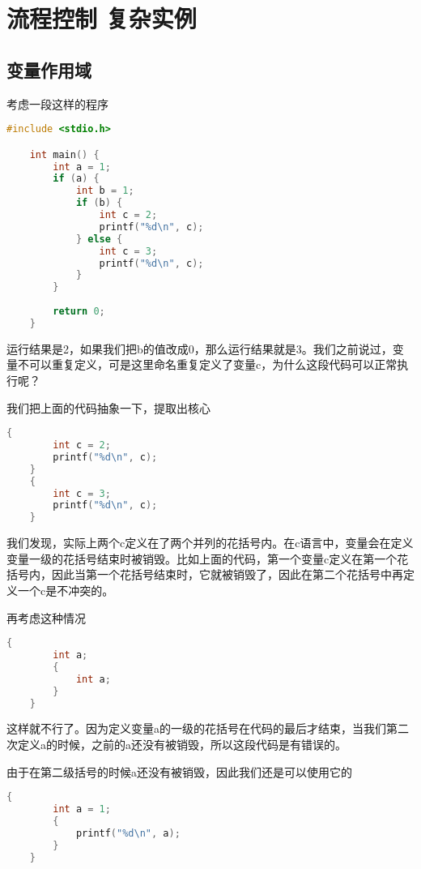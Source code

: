 \section{流程控制 复杂实例}

\subsection{变量作用域}

考虑一段这样的程序

\begin{lstlisting}[language=C]
    #include <stdio.h>

    int main() {
        int a = 1;
        if (a) {
            int b = 1;
            if (b) {
                int c = 2;
                printf("%d\n", c);
            } else {
                int c = 3;
                printf("%d\n", c);
            }
        }
        
        return 0;
    }
\end{lstlisting}

运行结果是2，如果我们把b的值改成0，那么运行结果就是3。我们之前说过，变量不可以重复定义，可是这里命名重复定义了变量c，为什么这段代码可以正常执行呢？

我们把上面的代码抽象一下，提取出核心

\begin{lstlisting}[language=C]
    {
        int c = 2;
        printf("%d\n", c);
    }
    {
        int c = 3;
        printf("%d\n", c);
    }
\end{lstlisting}

我们发现，实际上两个c定义在了两个并列的花括号内。在c语言中，变量会在定义变量一级的花括号结束时被销毁。比如上面的代码，第一个变量c定义在第一个花括号内，因此当第一个花括号结束时，它就被销毁了，因此在第二个花括号中再定义一个c是不冲突的。

再考虑这种情况

\begin{lstlisting}[language=c]
    {
        int a;
        {
            int a;
        }
    }
\end{lstlisting}

这样就不行了。因为定义变量a的一级的花括号在代码的最后才结束，当我们第二次定义a的时候，之前的a还没有被销毁，所以这段代码是有错误的。

由于在第二级括号的时候a还没有被销毁，因此我们还是可以使用它的

\begin{lstlisting}[language=c]
    {
        int a = 1;
        {
            printf("%d\n", a);
        }
    }
\end{lstlisting}

